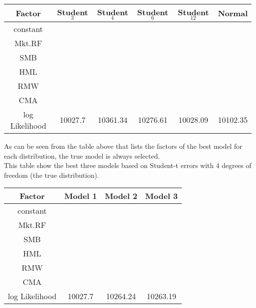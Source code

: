 \documentclass[12pt]{article}
\begin{document}
\begin{table}[]
	\centering
	\begin{tabular}{cccccc}
		Factor & Student$_{3}$ & Student$_{4}$ & Student$_{6}$ & Student$_{12}$ & Normal \\ 
		\hline
		constant &  &  &  &  &  \\ 
		Mkt.RF & \checkmark & \checkmark & \checkmark & \checkmark & \checkmark \\ 
		SMB & \checkmark & \checkmark & \checkmark & \checkmark & \checkmark \\ 
		HML & \checkmark & \checkmark & \checkmark & \checkmark & \checkmark \\ 
		RMW &  &  &  &  &  \\ 
		CMA &  &  &  &  &  \\ 
		\hline
		log Likelihood & 10027.7 & 10361.34 & 10276.61 & 10028.09 & 10102.35 \\ 
	\end{tabular}
\end{table}
As can be seen from the table above that lists the factors of the best model for each distribution, the true model is always selected. \\

This table show the best three models based on Student-t errors with 4 degrees of freedom (the true distribution).
\begin{table}[ht]
	\centering
	\begin{tabular}{cccc}
		Factor & Model 1 & Model 2 & Model 3 \\ 
		\hline
		constant &  &  & \checkmark \\ 
		Mkt.RF & \checkmark & \checkmark & \checkmark \\ 
		SMB & \checkmark & \checkmark & \checkmark \\ 
		HML & \checkmark & \checkmark & \checkmark \\ 
		RMW &  & \checkmark &  \\ 
		CMA &  &  &  \\ 
		\hline
		log Likelihood & 10027.7 & 10264.24 & 10263.19 \\ 
	\end{tabular}
\end{table} \\
\end{document}
